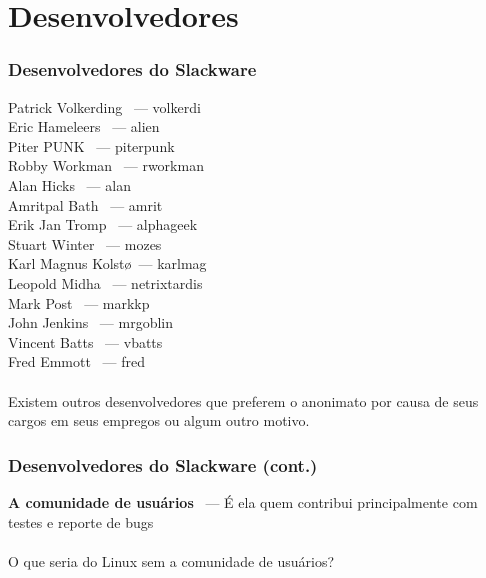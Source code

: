 \documentclass[aspectratio=169]{beamer}
\begin{document}
\section{Desenvolvedores}
\begin{frame}
	\frametitle{Desenvolvedores do Slackware}
	\footnotesize{
	Patrick Volkerding ~--- volkerdi\@@ \\
	Eric Hameleers ~--- alien\@@ \\
	Piter PUNK ~--- piterpunk\@@ \\
	Robby Workman ~--- rworkman\@@ \\
	Alan Hicks ~--- alan\@@ \\
	Amritpal Bath ~--- amrit\@@ \\
	Erik Jan Tromp ~--- alphageek\@@ \\
	Stuart Winter ~--- mozes\@@ \\
	Karl Magnus Kolst\o ~--- karlmag\@@ \\
	Leopold Midha ~--- netrixtardis\@@ \\
	Mark Post ~--- markkp\@@ \\
	John Jenkins ~--- mrgoblin\@@ \\
	Vincent Batts ~--- vbatts\@@ \\
	Fred Emmott ~--- fred\@@ \\
	}
	~\\
	Existem outros desenvolvedores que preferem o anonimato por causa de seus
	cargos em seus empregos ou algum outro motivo.	
\end{frame}

\begin{frame}
	\frametitle{Desenvolvedores do Slackware (cont.)}
	\textbf{A comunidade de usuários} ~--- É ela quem contribui principalmente
	com testes e reporte de bugs
	~\\
	~\\
	O que seria do Linux sem a comunidade de usuários?
\end{frame}
\end{document}
